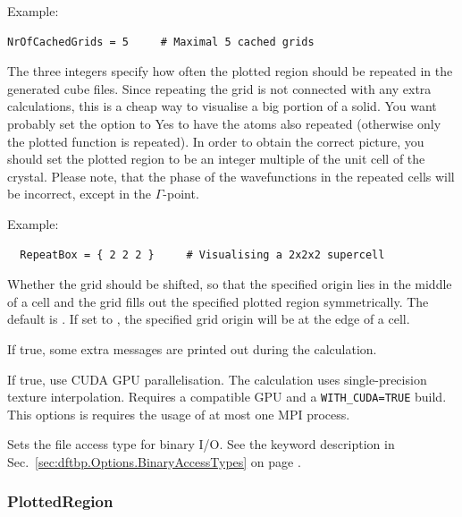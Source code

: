 \begin{description}
Example:
\begin{verbatim}
NrOfCachedGrids = 5     # Maximal 5 cached grids
\end{verbatim}

\item[\is{RepeatBox}] The three integers specify how often the plotted
  region should be repeated in the generated cube files. Since
  repeating the grid is not connected with any extra calculations,
  this is a cheap way to visualise a big portion of a solid.  You want
  probably set the  option to Yes to have the
  atoms also repeated (otherwise only the plotted function is
  repeated).  In order to obtain the correct picture, you should set
  the plotted region to be an integer multiple of the unit cell of the
  crystal. Please note, that the phase of the wavefunctions in the
  repeated cells will be incorrect, except in the $\Gamma$-point.

Example:
\begin{verbatim}
  RepeatBox = { 2 2 2 }     # Visualising a 2x2x2 supercell
\end{verbatim}

\item[\is{ShiftGrid}] Whether the grid should be shifted, so that the specified
  origin lies in the middle of a cell and the grid fills out the specified
  plotted region symmetrically. The default is . If set to , the
  specified grid origin will be at the edge of a cell.

\item[\is{Verbose}] If true, some extra messages are printed out
  during the calculation.

\item[\is{UseGpu}] If true, use CUDA GPU parallelisation.
  The calculation uses single-precision texture interpolation.
  Requires a compatible GPU and a \verb|WITH_CUDA=TRUE| build.
  This options is requires the usage of at most one MPI process.

\item[\is{BinaryAccessTypes}] Sets the file access type for binary I/O. See the
  keyword description in Sec.~\ref{sec:dftbp.Options.BinaryAccessTypes} on page
  .

\end{description}


\subsubsection{PlottedRegion}
\label{sec:waveplot.PlottedRegion}

